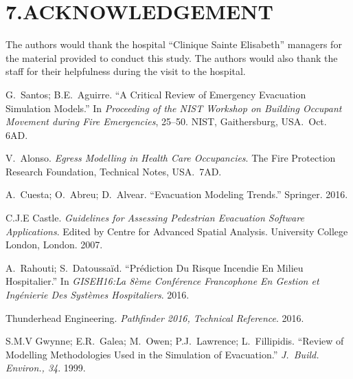 \documentclass{style/llncs}
\begin{document}
\section{7.\hspace*{0.5em}ACKNOWLEDGEMENT}\label{sec-acknowledgement}%

\noindent{}The authors would thank the hospital “Clinique Sainte Elisabeth” managers 
for the material provided to conduct this study. The authors would also
 thank the staff for their helpfulness during the visit to the hospital.%

{%
\begin{thebibliography}{36}%
\label{sec-bibliography}%

G.~Santos; B.E.~Aguirre. \textquotedblleft{}A Critical Review of Emergency Evacuation Simulation Models.\textquotedblright{} In \emph{Proceeding of the NIST Workshop on Building Occupant Movement during Fire Emergencies}, 25–50. NIST, Gaithersburg, USA.~Oct. 6AD.\label{3}%

V.~Alonso. \emph{Egress Modelling in Health Care Occupancies}. The Fire Protection Research Foundation, Technical Notes, USA.~7AD.\label{18}%

A.~Cuesta; O.~Abreu; D.~Alvear. \textquotedblleft{}Evacuation Modeling Trends.\textquotedblright{} Springer. 2016.\label{13}%

C.J.E Castle. \emph{Guidelines for Assessing Pedestrian Evacuation Software Applications}. Edited by Centre for Advanced Spatial Analysis. University College London, London. 2007.\label{4}%

A.~Rahouti; S.~Datoussaïd. \textquotedblleft{}Prédiction Du Risque Incendie En Milieu Hospitalier.\textquotedblright{} In \emph{GISEH16:La 8ème Conférence Francophone En Gestion et Ingénierie Des Systèmes Hospitaliers}. 2016.\label{31}%

Thunderhead Engineering. \emph{Pathfinder 2016, Technical Reference}. 2016.\label{14}%

S.M.V Gwynne; E.R.~Galea; M.~Owen; P.J.~Lawrence; L.~Fillipidis. \textquotedblleft{}Review of Modelling Methodologies Used in the Simulation of Evacuation.\textquotedblright{} \emph{J.~Build. Environ., 34}. 1999.\label{5}%


\end{thebibliography}}
\end{document}
